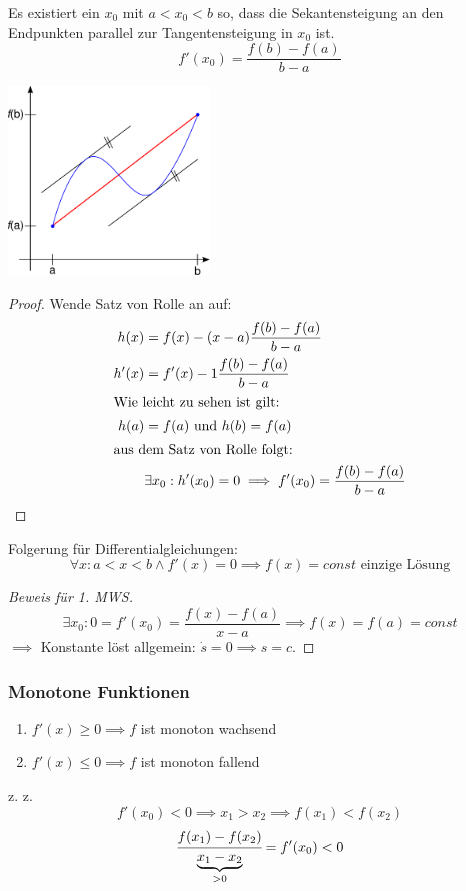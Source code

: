\begin{theorem}
Es existiert ein $x_0$ mit $a < x_0 < b$ so, dass die Sekantensteigung an den Endpunkten parallel zur Tangentensteigung in $x_0$ ist.
\begin{equation*}
	f'(x_0) = \frac{f(b) - f(a)}{b - a}
\end{equation*}
\end{theorem}
\begin{center}
	\includegraphics[width=0.4\textwidth]{include/20091201-3.pdf}
\end{center}
\begin{proof}
	Wende Satz von Rolle an auf:
	\begin{align*}
		h(x) &= f(x) - (x - a)\frac{f(b) - f(a)}{b - a} \\
		h'(x) &= f'(x) - 1\frac{f(b) - f(a)}{b - a} \\
		\intertext{Wie leicht zu sehen ist gilt:}
		h(a) &= f(a)\text{ und }h(b) = f(a) \\
		\intertext{aus dem Satz von Rolle folgt:}
		&\exists x_0 : h'(x_0) = 0 \implies f'(x_0) = \frac{f(b) - f(a)}{b - a}
	\end{align*}
\end{proof}
Folgerung für Differentialgleichungen:
\begin{equation*}
	\forall x : a < x < b \wedge f'(x) = 0 \implies f(x) = const \text{ einzige Lösung}
\end{equation*}
\begin{proof}[Beweis für 1. MWS]
	\begin{equation*}
		\exists x_0 : 0 = f'(x_0) = \frac{f(x) - f(a)}{x - a} \implies f(x) = f(a) = const
	\end{equation*}
	$\implies$ Konstante löst allgemein: $\dot s = 0 \implies s = c$.
\end{proof}

\subsubsection*{Monotone Funktionen}
\begin{enumerate}
	\item $f'(x) \geq 0 \implies f$ ist monoton wachsend
	\item $f'(x) \leq 0 \implies f$ ist monoton fallend
\end{enumerate}
\begin{example}
	z. z. \[f'(x_0) < 0 \implies x_1 > x_2 \implies f(x_1) < f(x_2)\]
	\[\cfrac{f(x_1) - f(x_2)}{\underbrace{x_1 - x_2}_{> 0}} = f'(x_0) < 0\]
\end{example}

